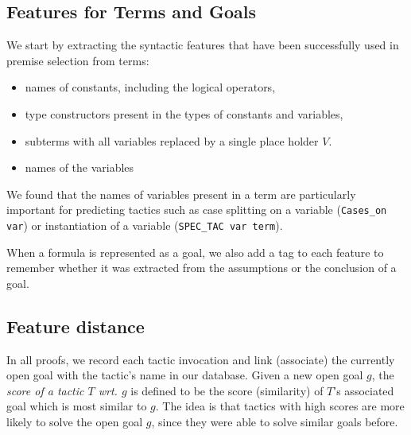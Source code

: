 \documentclass[runningheads,a4paper,draft]{svjour3}
\begin{document}
\subsection{Features for Terms and Goals}\label{sec:features}

We start by extracting the syntactic features that have been successfully used 
in premise selection from terms:
\begin{itemize}
\item names of constants, including the logical operators,
\item type constructors present in the types of constants and variables,
\item subterms with all variables replaced by a single place holder $V$.
\item names of the variables
\end{itemize}


We found that the names of variables present in a term are particularly 
important for predicting tactics such as 
case splitting on a variable 
(\texttt{Cases\_on var}) or instantiation of a variable 
(\texttt{SPEC\_TAC var term}). 


When a formula is represented as a goal, we also add a tag to each 
feature to remember whether it was extracted from the assumptions or the 
conclusion of a goal.




\subsection{Feature distance}\label{sec:predictions}

In all proofs, we record each tactic invocation and link (associate) the 
currently open goal with the tactic's name in our database.
Given a new open goal $g$, the \emph{score of a tactic $T$ wrt. $g$} is defined 
to be the score (similarity) of $T$'s 
associated goal which is most similar to $g$.
The idea is that tactics with high scores are more likely to solve the open 
goal $g$, 
since they were able to solve similar goals before.
\end{document}
